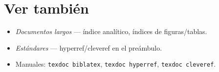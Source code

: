 \documentclass[11pt,a4paper]{article}
\newcommand{\pkg}[1]{\textsf{#1}}
\begin{document}
\section*{Ver también}
\begin{itemize}[noitemsep,leftmargin=*]
  \item \emph{Documentos largos} — índice analítico, índices de figuras/tablas.
  \item \emph{Estándares} — \pkg{hyperref}/\pkg{cleveref} en el preámbulo.
  \item Manuales: \texttt{texdoc biblatex}, \texttt{texdoc hyperref},
        \texttt{texdoc cleveref}.
\end{itemize}

\printbibliography[heading=bibintoc, title={Bibliografía}]
\end{document}
